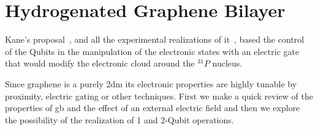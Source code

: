 \chapter{Hydrogenated Graphene Bilayer}
\label{ch:bilayer}
Kane's proposal~\cite{Kane1988}, and all the experimental realizations of it~\cite{Morello2010}, based the control of the Qubits in the manipulation of the electronic states with an electric gate that would modify the electronic cloud around the $^{31}P$ nucleus.

Since graphene is a purely \ac{2dm} its electronic properties are highly tunable by proximity, electric gating or other techniques. First we make a quick review of the properties of \ac{gb} and the effect of an external electric field and then we explore the possibility of the realization of 1 and 2-Qubit operations.

